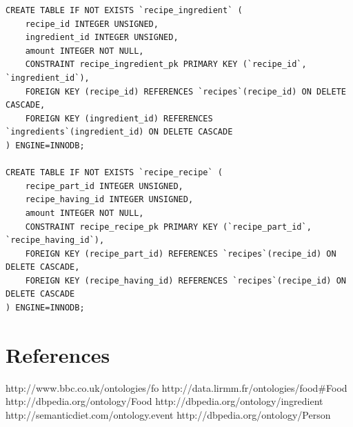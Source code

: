 \begin{lstlisting}[caption=Script of database]
CREATE TABLE IF NOT EXISTS `recipe_ingredient` (
    recipe_id INTEGER UNSIGNED,
    ingredient_id INTEGER UNSIGNED,
    amount INTEGER NOT NULL,
    CONSTRAINT recipe_ingredient_pk PRIMARY KEY (`recipe_id`, `ingredient_id`),
    FOREIGN KEY (recipe_id) REFERENCES `recipes`(recipe_id) ON DELETE CASCADE,
    FOREIGN KEY (ingredient_id) REFERENCES `ingredients`(ingredient_id) ON DELETE CASCADE
) ENGINE=INNODB;

CREATE TABLE IF NOT EXISTS `recipe_recipe` (
    recipe_part_id INTEGER UNSIGNED,
    recipe_having_id INTEGER UNSIGNED,
    amount INTEGER NOT NULL,
    CONSTRAINT recipe_recipe_pk PRIMARY KEY (`recipe_part_id`, `recipe_having_id`),
    FOREIGN KEY (recipe_part_id) REFERENCES `recipes`(recipe_id) ON DELETE CASCADE,
    FOREIGN KEY (recipe_having_id) REFERENCES `recipes`(recipe_id) ON DELETE CASCADE
) ENGINE=INNODB;

\end{lstlisting}
\section*{References}
http://www.bbc.co.uk/ontologies/fo\newline
http://data.lirmm.fr/ontologies/food#Food\newline
http://dbpedia.org/ontology/Food \newline
http://dbpedia.org/ontology/ingredient\newline
http://semanticdiet.com/ontology.event \newline
http://dbpedia.org/ontology/Person \newline

